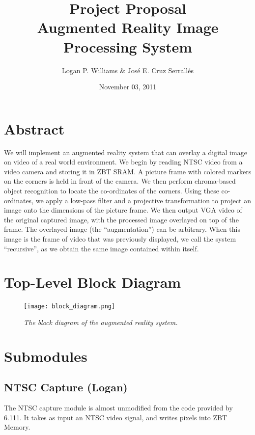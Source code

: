 \documentclass[10pt]{article}
\begin{document}
\title{Project Proposal\\Augmented Reality Image Processing System}
\author{Logan P. Williams \& Jos\'{e} E. Cruz Serrall\'{e}s}
\date{November 03, 2011}
\maketitle



\section*{Abstract}
We will implement an augmented reality system that can overlay a digital image on video of a real world environment. We begin by reading NTSC video from a video camera and storing it in ZBT SRAM. A picture frame with colored markers on the corners is held in front of the camera. We then perform chroma-based object recognition to locate the co-ordinates of the corners. Using these co-ordinates, we apply a low-pass filter and a projective transformation to project an image onto the dimensions of the picture frame. We then output VGA video of the original captured image, with the processed image overlayed on top of the frame. The overlayed image (the ``augmentation'') can be arbitrary. When this image is the frame of video that was previously displayed, we call the system ``recursive'', as we obtain the same image contained within itself.

\tableofcontents


\section{Top-Level Block Diagram}
\begin{figure}[h]
\centering
\texttt{[image: block\_diagram.png]}
\caption{\emph{The block diagram of the augmented reality system.}}
\end{figure}
\section{Submodules}
\subsection{NTSC Capture (Logan)}
The NTSC capture module is almost unmodified from the code provided by 6.111. It takes as input an NTSC video signal, and writes pixels into ZBT Memory.
\end{document}
